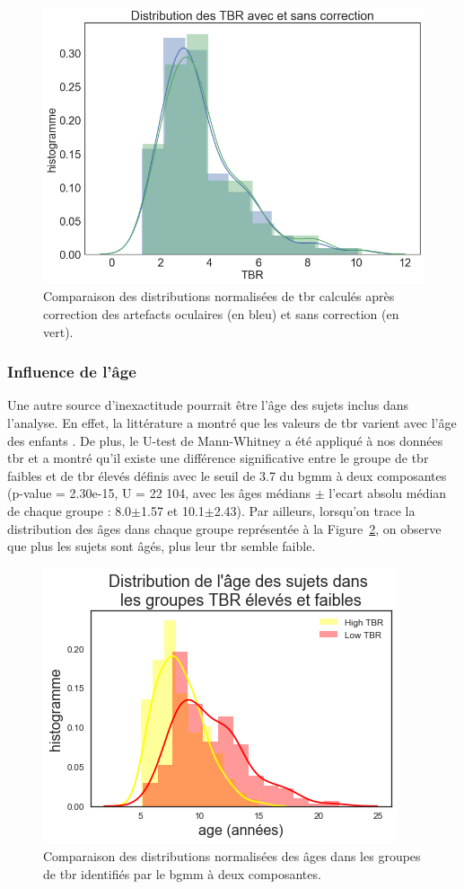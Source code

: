 \begin{figure}[h!]
  \centering
	\includegraphics[width=0.5\linewidth]{figures/chapter-4/tbr-eye-artifact-correction} 
  \caption{Comparaison des distributions normalisées de \gls{tbr} calculés après correction des artefacts oculaires (en bleu) et sans correction (en vert).}
  \label{Figure:tbr_eye_artifact_correction}
\end{figure}

\subsubsection{Influence de l'âge}

Une autre source d'inexactitude pourrait être l'âge des sujets inclus dans l'analyse. En effet, la littérature a montré que les valeurs de \gls{tbr} varient
avec l'âge des enfants \citep{Liechti2013, Snyder2015, Perone2018}. De plus, le U-test de Mann-Whitney a été appliqué à nos données \gls{tbr} et a montré
qu'il existe une différence significative entre le groupe de \gls{tbr} faibles et de \gls{tbr} élevés définis avec le seuil de 3.7 du \gls{bgmm} à deux composantes
(p-value = 2.30e-15, U = 22 104, avec les âges médians $\pm$ l'ecart absolu médian de chaque groupe : 8.0$\pm$1.57 et 10.1$\pm$2.43). Par ailleurs, lorsqu'on trace
la distribution des âges dans chaque groupe représentée à la Figure~\ref{Figure:tbr_age_distribution}, on observe que plus les sujets sont âgés, plus leur 
\gls{tbr} semble faible.

\begin{figure}[h!]
  \centering
	\includegraphics[width=0.5\linewidth]{figures/chapter-4/tbr-age-distribution} 
  \caption{Comparaison des distributions normalisées des âges dans les groupes de \gls{tbr} identifiés par le \gls{bgmm} à deux composantes.}
  \label{Figure:tbr_age_distribution}
\end{figure}

